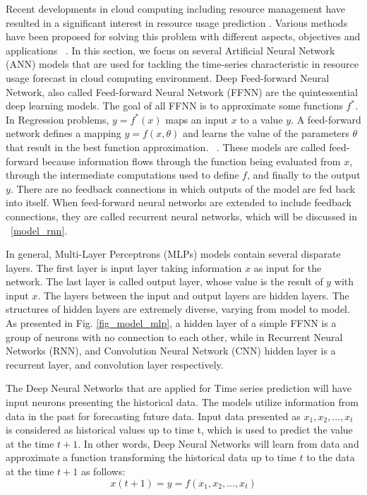 \documentclass[a4paper,13pt,2p]{report}
\begin{document}
	Recent developments in cloud computing including resource management have resulted in a significant interest in resource usage prediction . Various methods have been proposed for solving this problem with different aspects, objectives and applications ~\cite{amiri2017survey}. In this section, we focus on several Artificial Neural Network (ANN) models that are used for tackling the time-series characteristic in resource usage forecast in cloud computing environment.
	Deep Feed-forward Neural Network, also called Feed-forward Neural Network (FFNN) are the quintessential deep learning models. The goal of all FFNN is to approximate some functions $f^*$.  In Regression problems, $y = f^*(x)$ maps an input $x$ to a value $y$. A feed-forward network defines a mapping $y = f(x,\theta)$ and learns the value of the parameters $\theta$ that result in the best function approximation. ~\cite{Goodfellow-et-al-2016}. These models are called feed-forward because information flows through the function being evaluated from $x$, through the intermediate computations used to define $f$, and finally to the output $y$. There are no feedback connections in which outputs of the model are fed back into itself. When feed-forward neural networks are extended to include feedback connections, they are called recurrent neural networks, which will be discussed in ~\ref{model_rnn}.
	
	In general, Multi-Layer Perceptrons (MLPs) models contain several disparate layers. The first layer is input layer taking information $x$ as input for the network. The last layer is called output layer, whose value is the result of $y$ with input $x$. The layers between the input and output layers are hidden layers. The structures of hidden layers are extremely diverse, varying from model to model. As presented in Fig. \ref{fig_model_mlp}, a hidden layer of a simple FFNN is a group of neurons with no connection to each other, while in Recurrent Neural Networks (RNN), and Convolution Neural Network (CNN) hidden layer is a recurrent layer, and convolution layer respectively. 
	
	The Deep Neural Networks that are applied for Time series prediction will have input neurons presenting the historical data. The models utilize information from data in the past for forecasting future data. Input data presented as $x_1, x_2, ..., x_t$ is considered as historical values up to time t, which is used to predict the value at the time $t+1$. In other words, Deep Neural Networks will learn from data and approximate a function transforming the historical data up to time $t$ to the data at the time $t+1$ as follows:
\begin{equation} \label{eq_ffnn_1}
x(t+1) = y = f(x_1, x_2, ..., x_t)
\end{equation}
	
\end{document}
